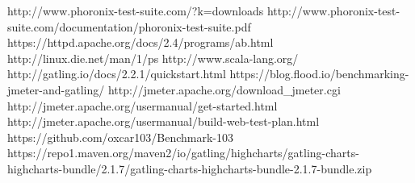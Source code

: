 \begin{thebibliography}{xx}
	 http://www.phoronix-test-suite.com/?k=downloads
	 http://www.phoronix-test-suite.com/documentation/phoronix-test-suite.pdf
	 https://httpd.apache.org/docs/2.4/programs/ab.html
	 http://linux.die.net/man/1/ps
	 http://www.scala-lang.org/
	 http://gatling.io/docs/2.2.1/quickstart.html
	 https://blog.flood.io/benchmarking-jmeter-and-gatling/
	 http://jmeter.apache.org/download\_jmeter.cgi
	 http://jmeter.apache.org/usermanual/get-started.html
	 http://jmeter.apache.org/usermanual/build-web-test-plan.html
	 https://github.com/oxcar103/Benchmark-103
	https://repo1.maven.org/maven2/io/gatling/highcharts/gatling-charts-highcharts-bundle/2.1.7/gatling-charts-highcharts-bundle-2.1.7-bundle.zip
	
	
\end{thebibliography}
